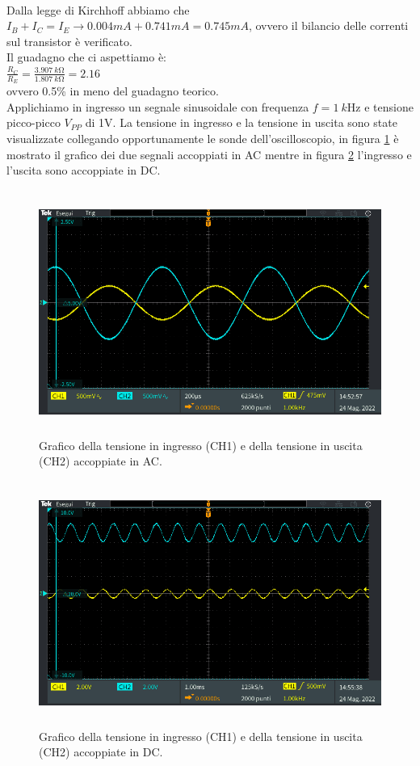 \documentclass{report}
\begin{document}
\\\indent Dalla legge di Kirchhoff abbiamo che $I_B+I_C=I_E\rightarrow 0.004mA+0.741mA=0.745mA$, ovvero il bilancio delle correnti sul transistor è verificato.
\\Il guadagno che ci aspettiamo è:
\\[2pt]\indent$\displaystyle{\frac{R_C}{R_E}=\frac{\SI{3.907}{k\ohm}}{\SI{1.807}{k\ohm}}= 2.16}$
\\[2pt]ovvero 0.5\% in meno del guadagno teorico.
\\Applichiamo in ingresso un segnale sinusoidale con frequenza $f=\SI{1}{k\hertz}$ e tensione picco-picco $V_{PP}$ di 1V. La tensione in ingresso e la tensione in uscita sono state visualizzate collegando opportunamente le sonde dell'oscilloscopio, in figura \ref{figura:oscillo4} è mostrato il grafico dei due segnali accoppiati in AC mentre in figura \ref{figura:oscillo5} l'ingresso e l'uscita sono accoppiate in DC.
\begin{figure}[h]
\centering
\includegraphics[height=8cm]{immagini/oscillo4}
\caption{Grafico della tensione in ingresso (CH1) e della tensione in uscita (CH2) accoppiate in AC.}
\label{figura:oscillo4}
\end{figure}
\begin{figure}[h!]
\centering
\includegraphics[height=8cm]{immagini/oscillo5}
\caption{Grafico della tensione in ingresso (CH1) e della tensione in uscita (CH2) accoppiate in DC.}
\label{figura:oscillo5}
\end{figure}
\end{document}
